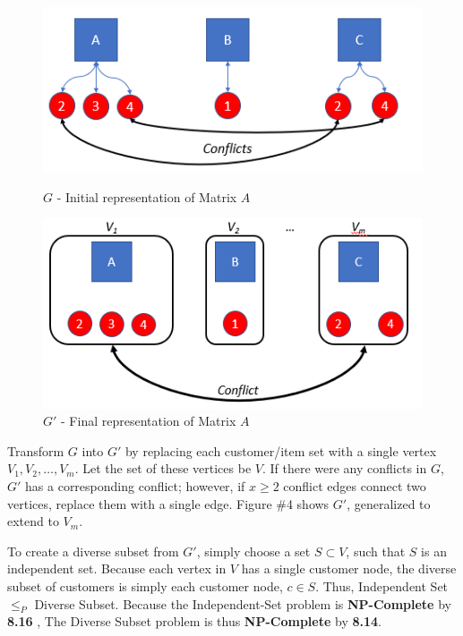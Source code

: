 \documentclass{article}
\begin{document}
\begin{figure}[!h]
  \centering
  \begin{minipage}[b]{0.45\textwidth}
    \includegraphics[width=.9\textwidth]{Images/Discrete_Init.png}
    \caption{$G$ - Initial representation of Matrix $A$}
  \end{minipage}
  \hfill
  \begin{minipage}[b]{0.45\textwidth}
    \includegraphics[width=.9\textwidth]{Images/Discrete_Final.png}
    \caption{$G'$ - Final representation of Matrix $A$}
  \end{minipage}
\end{figure}

Transform $G$ into $G'$ by replacing each customer/item set with a single vertex $V_1, V_2, \dots , V_m$.  Let the set of these vertices be $V$.
If there were any conflicts in $G$, $G'$ has a corresponding conflict; however, if $x \geq 2$ conflict edges connect two vertices, replace them with a single edge.  Figure \#4 shows $G'$, generalized to extend to $V_m$.

To create a diverse subset from $G'$, simply choose a set $S \subset V$, such that $S$ is an independent set.  Because each vertex in $V$ has a single customer node, the diverse subset of customers is simply each customer node, $c \in S$.
Thus, Independent Set $\leq_P$ Diverse Subset.
Because the Independent-Set problem is \textbf{NP-Complete} by \textbf{8.16} \cite{algDesign}, 
The Diverse Subset problem is thus \textbf{NP-Complete} by \textbf{8.14}.
\end{document}
